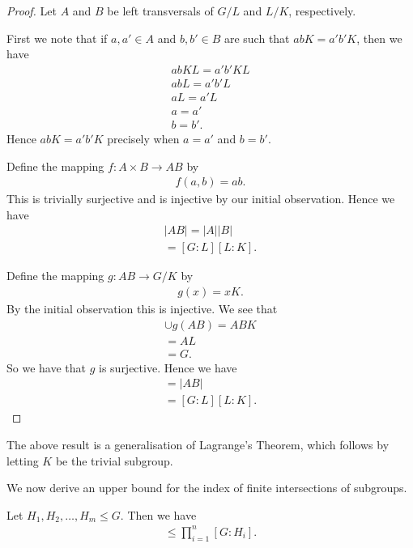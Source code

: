 \documentclass[]{article}
\begin{document}
\begin{proof}
		Let $A$ and $B$ be left transversals of $G / L$ and $L / K$, respectively. 

		First we note that if $a, a' \in A$ and $b, b' \in B$ are such that $abK = a'b'K$, then we have
		\begin{align*}
				abKL = a'b'KL \\
				abL = a'b'L \\
				aL = a'L \\
				a = a' \\
				b = b'.
		\end{align*}
		Hence $abK = a'b'K$ precisely when $a = a'$ and $b = b'$.

		Define the mapping $f: A \times B \to AB$ by 
		\begin{align*}
				f(a,b) = ab.
		\end{align*}
		This is trivially surjective and is injective by our initial observation. Hence we have
		\begin{align*}
				|AB| = |A||B| \\
				= [G:L][L:K].
		\end{align*}

		Define the mapping $g: AB \to G / K$ by 
		\begin{align*}
				g(x) = xK.
		\end{align*}
		By the initial observation this is injective. We see that
		\begin{align*}
				\cup g(AB) = ABK \\
				= AL \\
				= G.
		\end{align*}
		So we have that $g$ is surjective. Hence we have
		\begin{align*}
				[G : K] = |AB| \\
				= [G:L][L:K].
		\end{align*}
\end{proof}

The above result is a generalisation of Lagrange's Theorem, which follows by letting $K$ be the trivial subgroup.

We now derive an upper bound for the index of finite intersections of subgroups.

\begin{thm}
		Let $H_1, H_2, \ldots, H_m \leq G$. Then we have
		\begin{align*}
				[G : \cap_{i=1}^n H_i] \leq \prod_{i = 1}^n [G : H_i].
		\end{align*}
\end{thm}
\end{document}
